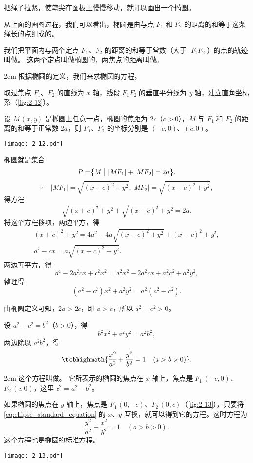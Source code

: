 \medskip\noindent
把绳子拉紧，使笔尖在图板上慢慢移动，就可以画出一个椭圆。

从上面的画图过程，我们可以看出，椭圆是由与点 $F_1$ 和 $F_2$ 的距离的和等于这条绳长的点组成的。

我们把平面内与两个定点 $F_1$、$F_2$ 的距离的和等于常数（大于 $|F_1F_2|$）的点的轨迹叫做。
这两个定点叫做椭圆的，两焦点的距离叫做。

\medskip\noindent
\begin{minipage}{0.6\linewidth}\parindent2em
根据椭圆的定义，我们来求椭圆的方程。

取过焦点 $F_1$、$F_2$ 的直线为 $x$ 轴，线段 $F_1F_2$ 的垂直平分线为 $y$ 轴，建立直角坐标系（\cref{fig:2-12}）。

设 $M\,(x,y)$ 是椭圆上任意一点，椭圆的焦距为 $2c$（$c>0$），$M$ 与 $F_1$ 和 $F_2$ 的距离的和等于正常数 $2a$，则 $F_1$、$F_2$ 的坐标分别是 $(-c,0)$、$(c,0)$。
\end{minipage}\hfill
\begin{minipage}{0.35\linewidth}\centering
\begin{figurehere}
  \texttt{[image: 2-12.pdf]}
  \caption{}\label{fig:2-12}
\end{figurehere}
\end{minipage}

\medskip
椭圆就是集合
\[P=\bigr\{M \bigm\vert |MF_1|+|MF_2|=2a \bigr\}.\]
\[ \because \quad |MF_1|=\sqrt{(x+c)^2+y^2},|MF_2|=\sqrt{(x-c)^2+y^2},\]
得方程
\[\sqrt{(x+c)^2+y^2}+\sqrt{(x-c)^2+y^2}=2a.\]
将这个方程移项，两边平方，得
\begin{gather*}
  (x+c)^2+y^2=4a^2-4a\sqrt{(x-c)^2+y^2}+(x-c)^2+y^2,\\
  a^2-cx=a\sqrt{(x-c)^2+y^2}.
\end{gather*}
两边再平方，得
\[a^4-2a^2cx+c^2x^2=a^2x^2-2a^2cx+a^2c^2+a^2y^2,\]
整理得
\[(a^2-c^2)x^2+a^2y^2=a^2(a^2-c^2).\]

由椭圆定义可知，$2a>2c$，即 $a>c$，所以 $a^2-c^2>0$。

设 $a^2-c^2=b^2$（$b>0$），得
\[ b^2x^2+a^2y^2=a^2b^2,\]
两边除以 $a^2b^2$，得
\begin{equation}
  \label{eq:ellipse_standard_equation} 
  \tcbhighmath{\frac{x^2}{a^2}+\frac{y^2}{b^2}=1\quad(a>b>0)}.
\end{equation}


\medskip\noindent
\begin{minipage}{0.6\linewidth}\parindent2em
这个方程叫做。
它所表示的椭圆的焦点在 $x$ 轴上，焦点是 $F_1\,(-c,0)$、$F_2\,(c,0)$，这里 $c^2=a^2-b^2$。

如果椭圆的焦点在 $y$ 轴上，焦点是 $F_1\,(0,-c)$、$F_2\,(0,c)$（\cref{fig:2-13}），只要将\cref{eq:ellipse_standard_equation} 的 $x$、$y$ 互换，就可以得到它的方程。这时方程为
\[ \frac{y^2}{a^2}+\frac{x^2}{b^2}=1\quad(a>b>0). \]
这个方程也是椭圆的标准方程。
\end{minipage}\hfill
\begin{minipage}{0.35\linewidth}\centering
\begin{figurehere}
  \texttt{[image: 2-13.pdf]}
  \caption{}\label{fig:2-13}
\end{figurehere}
\end{minipage}

